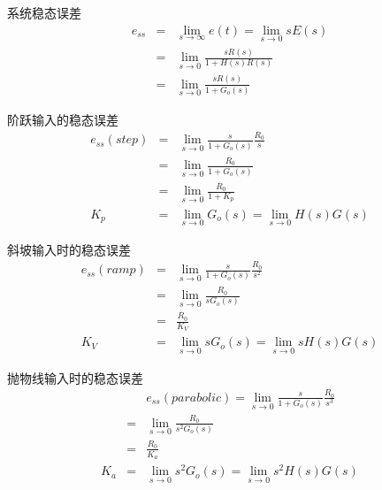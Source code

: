 \begin{frame}
\begin{block}{系统稳态误差}
\begin{eqnarray*}
e_{ss}&=&\lim_{s\rightarrow \infty}e(t)=\lim_{s\rightarrow 0}sE(s)\\
&=&\lim_{s\rightarrow 0}\frac{sR(s)}{1+H(s)R(s)}\\
&=&\lim_{s\rightarrow 0}\frac{sR(s)}{1+G_o(s)}
\end{eqnarray*}
\end{block}
\end{frame}
\begin{frame}
\begin{block}{阶跃输入的稳态误差}
\begin{eqnarray*}
e_{ss}(step)&=&\lim\limits_{s\rightarrow 0}\frac{s}{1+G_o(s)}\frac{R_0}{s}\\
&=&\lim\limits_{s\rightarrow 0}\frac{R_0}{1+G_o(s)}\\
&=&\lim\limits_{s\rightarrow 0}\frac{R_0}{1+K_p}\\
K_p&=&\lim\limits_{s\rightarrow 0}G_o(s)=\lim\limits_{s\rightarrow 0}H(s)G(s)
\end{eqnarray*}
\end{block}
\end{frame}
\begin{frame}
\begin{block}{斜坡输入时的稳态误差}
\begin{eqnarray*}
e_{ss}(ramp)&=&\lim\limits_{s\rightarrow 0}\frac{s}{1+G_o(s)}\frac{R_0}{s^2}\\
&=&\lim\limits_{s\rightarrow 0}\frac{R_0}{sG_o(s)}\\
&=&\frac{R_0}{K_V}\\
K_V&=&\lim\limits_{s\rightarrow 0}sG_o(s)=\lim\limits_{s\rightarrow 0}sH(s)G(s)
\end{eqnarray*}
\end{block}
\end{frame}
\begin{frame}
\begin{block}{抛物线输入时的稳态误差}
\begin{eqnarray*}
&&e_{ss}(parabolic)=\lim\limits_{s\rightarrow 0}\frac{s}{1+G_o(s)}\frac{R_0}{s^3}\\
&=&\lim\limits_{s\rightarrow 0}\frac{R_0}{s^2G_o(s)}\\
&=&\frac{R_0}{K_a}\\
K_a&=&\lim\limits_{s\rightarrow 0}s^2G_o(s)=\lim\limits_{s\rightarrow 0}s^2H(s)G(s)
\end{eqnarray*}
\end{block}
\end{frame}
\endinput